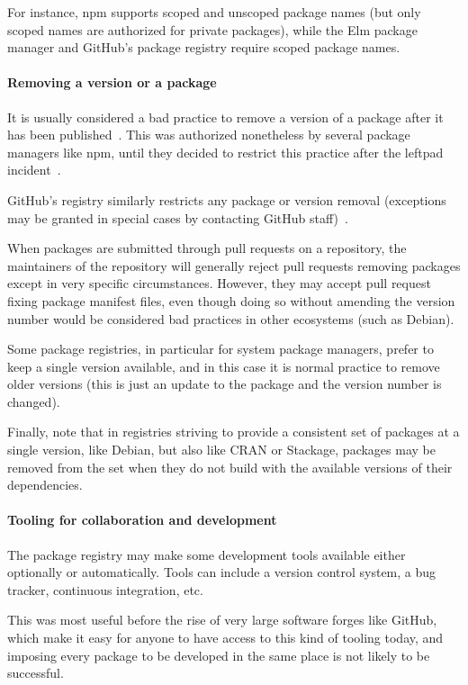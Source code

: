 For instance, npm supports scoped and unscoped package names (but only scoped names are authorized for private packages), while the Elm package manager and GitHub's package registry require scoped package names.

\paragraph{Removing a version or a package}

It is usually considered a bad practice to remove a version of a package after it has been published~\cite{npm-unpublish-documentation}.
This was authorized nonetheless by several package managers like npm, until they decided to restrict this practice after the leftpad incident~\cite{npm-unpublish-update}.

GitHub's registry similarly restricts any package or version removal (exceptions may be granted in special cases by contacting GitHub staff)~\cite{github_registry_update}.

When packages are submitted through pull requests on a repository, the maintainers of the repository will generally reject pull requests removing packages except in very specific circumstances.
However, they may accept pull request fixing package manifest files, even though doing so without amending the version number would be considered bad practices in other ecosystems (such as Debian).

Some package registries, in particular for system package managers, prefer to keep a single version available, and in this case it is normal practice to remove older versions (this is just an update to the package and the version number is changed).

Finally, note that in registries striving to provide a consistent set of packages at a single version, like Debian, but also like CRAN or Stackage, packages may be removed from the set when they do not build with the available versions of their dependencies.

\paragraph{Tooling for collaboration and development}

The package registry may make some development tools available either optionally or automatically.
Tools can include a version control system, a bug tracker, continuous integration, etc.

This was most useful before the rise of very large software forges like GitHub, which make it easy for anyone to have access to this kind of tooling today, and imposing every package to be developed in the same place is not likely to be successful.

